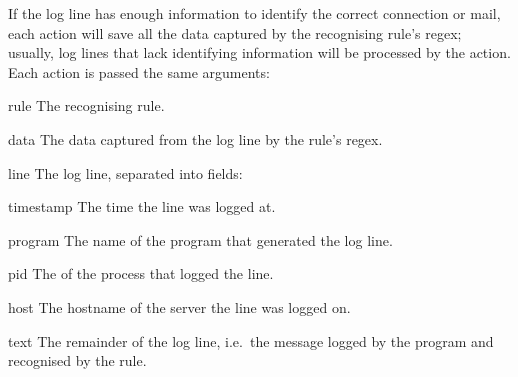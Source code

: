 If the log line has enough information to identify the correct connection
or mail, each action will save all the data captured by the recognising
rule's regex; usually, log lines that lack identifying information will be
processed by the  action.  Each action is passed the
same arguments:

\begin{boldeqlist}

    \squeezeitems{}

    \item [rule] The recognising rule.

    \item [data] The data captured from the log line by the rule's regex.

    \item [line] The log line, separated into fields:

        \begin{boldeqlist}

            \squeezeitems{}

            \item [timestamp] The time the line was logged at.

            \item [program] The name of the program that generated the log
                line.

            \item [pid] The  of the process that logged the
                line.

            \item [host] The hostname of the server the line was logged on.

            \item [text] The remainder of the log line, i.e.\ the message
                logged by the program and recognised by the rule.

        \end{boldeqlist}

\end{boldeqlist}

